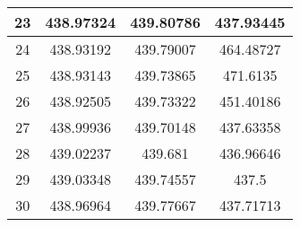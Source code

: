 \begin{table}
\begin{center}
\begin{tabular}{|c|c|c|c|}
23 & 438.97324 & 439.80786 & 437.93445 \\ \hline 
24 & 438.93192 & 439.79007 & 464.48727 \\ \hline 
25 & 438.93143 & 439.73865 & 471.6135  \\ \hline 
26 & 438.92505 & 439.73322 & 451.40186 \\ \hline 
27 & 438.99936 & 439.70148 & 437.63358 \\ \hline 
28 & 439.02237 & 439.681   & 436.96646 \\ \hline 
29 & 439.03348 & 439.74557 & 437.5     \\ \hline 
30 & 438.96964 & 439.77667 & 437.71713 \\ \hline 
\end{tabular}
\label{table:przyklad}
\end{center}
\end{table}



